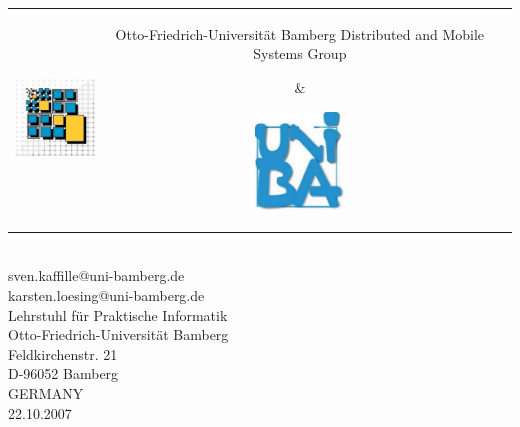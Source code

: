 

%

\begin{titlepage}

\begin{tabular}{ccc}
\includegraphics[height=26mm]{include/logo} &

\parbox{11cm}{
  \vspace{-2.6cm}
  \begin{center}
  Otto-Friedrich-Universit\"at Bamberg \newline 
  {\Large Distributed and Mobile Systems Group}
  \end{center}
} &

\includegraphics[height=26mm]{include/uni}\\
\\
\end{tabular} 
\\[24pt]
sven.kaffille@uni-bamberg.de\\
karsten.loesing@uni-bamberg.de\\[18pt]
Lehrstuhl f\"ur Praktische Informatik \\
Otto-Friedrich-Universit\"at Bamberg\\
Feldkirchenstr. 21\\
D-96052 Bamberg\\
GERMANY
\\[12pt]
22.10.2007\\
\newpage

\end{titlepage}

